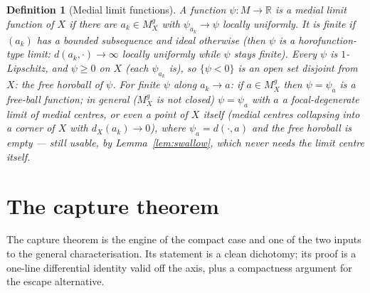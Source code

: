 \documentclass[11pt]{article}
\newtheorem{definition}[theorem]{Definition}
\theoremstyle{remark}
\newcommand{\R}{\mathbb{R}}
\newcommand{\X}{X}
\newcommand{\Mg}{M^{g}_{\X}}
\newcommand{\dX}{d_{\X}}
\begin{document}
\begin{definition}[Medial limit functions]\label{def:mlf}
A function $\psi:M\to\R$ is a \emph{medial limit function} of $\X$ if
there are $a_{k}\in\Mg$ with $\psi_{a_{k}}\to\psi$ locally uniformly.
It is \emph{finite} if $(a_{k})$ has a bounded subsequence and
\emph{ideal} otherwise (then $\psi$ is a horofunction-type limit:
$d(a_{k},\cdot)\to\infty$ locally uniformly while
$\psi$ stays finite). Every $\psi$ is $1$-Lipschitz, and
$\psi\ge0$ on $\X$ (each $\psi_{a_{k}}$ is), so $\{\psi<0\}$ is an open
set disjoint from $\X$: the \emph{free horoball} of $\psi$. For finite
$\psi$ along $a_{k}\to a$: if $a\in\Mg$ then $\psi=\psi_{a}$ is a
free-ball function; in general ($\Mg$ is not closed) $\psi=\psi_{a}$
with $a$ a focal-degenerate limit of medial centres, or even a point
of $\X$ itself (medial centres collapsing into a corner of $\X$ with
$\dX(a_{k})\to0$), where $\psi_{a}=d(\cdot,a)$ and the free horoball
is empty --- still usable, by Lemma~\ref{lem:swallow}, which never
needs the limit centre itself.
\end{definition}

\section{The capture theorem}\label{sec:capture}

The capture theorem is the engine of the compact case and one of the
two inputs to the general characterisation. Its statement is a clean
dichotomy; its proof is a one-line differential identity valid off
the axis, plus a compactness argument for the escape alternative.
\end{document}
